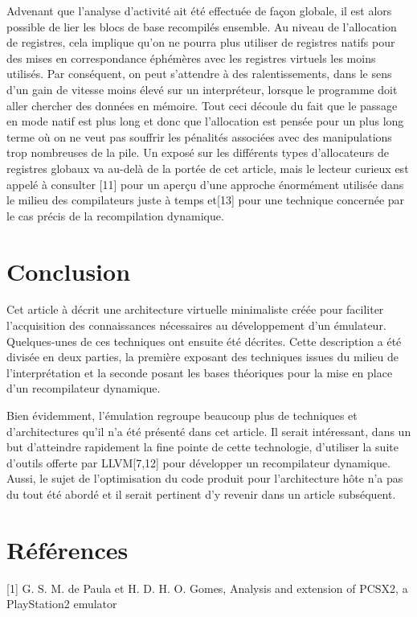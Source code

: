 \documentclass{article} %
\begin{document}
Advenant que l'analyse d'activité ait été effectuée de façon globale, il est alors possible de lier les blocs de base recompilés ensemble. Au niveau de l'allocation de registres, cela implique qu'on ne pourra plus utiliser de registres natifs pour des mises en correspondance éphémères avec les registres virtuels les moins utilisés. Par conséquent, on peut s'attendre à des ralentissements, dans le sens d'un gain de vitesse moins élevé sur un interpréteur, lorsque le programme doit aller chercher des données en mémoire. Tout ceci découle du fait que le passage en mode natif est plus long et donc que l'allocation est pensée pour un plus long terme où on ne veut pas souffrir les pénalités associées avec des manipulations trop nombreuses de la pile. Un exposé sur les différents types d'allocateurs de registres globaux va au-delà de la portée de cet article, mais le lecteur curieux est appelé à consulter [11] pour un aperçu d'une approche énormément utilisée dans le milieu des compilateurs juste à temps et[13] pour une technique concernée par le cas précis de la recompilation dynamique.

\section{Conclusion}
Cet article à décrit une architecture virtuelle minimaliste créée pour faciliter l'acquisition des connaissances nécessaires au développement d'un émulateur. Quelques-unes de ces techniques ont ensuite été décrites. Cette description a été divisée en deux parties, la première exposant des techniques issues du milieu de l'interprétation et la seconde posant les bases théoriques pour la mise en place d'un recompilateur dynamique.

Bien évidemment, l'émulation regroupe beaucoup plus de techniques et d'architectures qu'il n'a été présenté dans cet article. Il serait intéressant, dans un but d'atteindre rapidement la fine pointe de cette technologie, d'utiliser la suite d'outils offerte par LLVM[7,12] pour développer un recompilateur dynamique. Aussi, le sujet de l'optimisation du code produit pour l'architecture hôte n'a pas du tout été abordé et il serait pertinent d'y revenir dans un article subséquent.

\section{Références}
[1]		G. S. M. de Paula et H. D. H. O. Gomes, Analysis and extension of PCSX2, a PlayStation2 emulator
\end{document}

